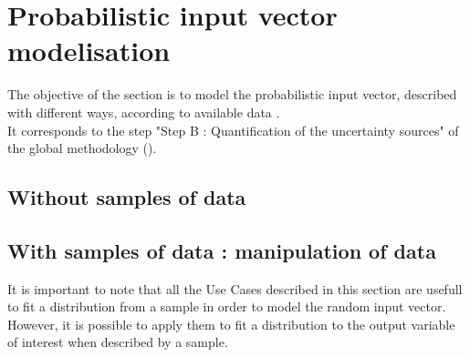 \newpage \section{Probabilistic input vector modelisation}


The objective of the section is to model the probabilistic input vector, described with different ways, according to available data .\\
It corresponds to the step "Step B : Quantification of the uncertainty sources" of the global methodology
().




\newpage \subsection{Without samples of data}



\newpage 
\newpage 
\newpage 
\newpage 
\newpage 
\newpage 
\newpage 
\newpage 

\newpage \subsection{With samples of data : manipulation of data}



It is important to note that all the Use Cases described in this section are usefull to fit a distribution from a sample in order to model the random input vector.  However, it is possible to apply them to fit a distribution to the output variable of interest when described by a sample.



